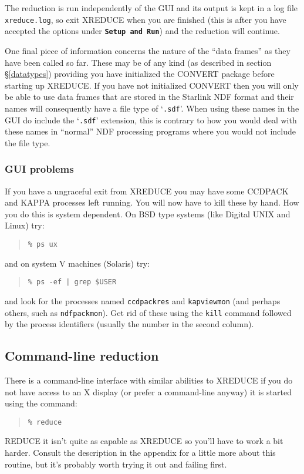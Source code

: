 \documentclass[twoside,11pt]{article}
\newcommand{\hyperref}[4]{#2\ref{#4}#3}
\newcommand{\htmlref}[2]{#1}
\newcommand{\xref}[3]{#1}
\renewcommand{\_}{\texttt{\symbol{95}}}
\newenvironment{myquote}{\begin{quote}\begin{small}}{\end{small}\end{quote}}
\newcommand{\butt}[1]{{\small \bf \tt #1}}
\newcommand{\text}[1]{{\small \tt #1}}
\newcommand{\routine}[1]{{\sc #1}}
\newcommand{\xroutine}[1]{\htmlref{{\sc #1}}{#1}}
\begin{document}
The reduction is run independently of the GUI and its output is kept
in a log file \text{xreduce.log}, so exit \routine{XREDUCE} when you
are finished (this is after you have accepted the options under
\butt{Setup and Run}) and the reduction will continue.

One final piece of information concerns the nature of the ``data
frames'' as they have been called so far. These may be of any kind (as
described \hyperref{later}{in section \S}{}{datatypes}) providing you
have initialized the \xref{CONVERT}{sun55}{} package before starting
up \routine{XREDUCE}.  If you have not initialized CONVERT then you
will only be able to use data frames that are stored in the Starlink
\xref{NDF}{sun33}{} format and their names will consequently have a
file type of `\text{.sdf}'. When using these names in the GUI do
include the `\text{.sdf}' extension, this is contrary to how you would
deal with these names in ``normal'' NDF processing programs where you
would not include the file type.

\subsubsection{GUI problems}
If you have a ungraceful exit from \xroutine{XREDUCE} you may have
some CCDPACK and \xref{KAPPA}{sun95}{} processes left running.  You
will now have to kill these by hand.  How you do this is system
dependent.  On BSD type systems (like Digital UNIX and Linux) try:
\begin{myquote}
\begin{verbatim}
% ps ux
\end{verbatim}
\end{myquote}
and on system V machines (Solaris) try:
\begin{myquote}
\begin{verbatim}
% ps -ef | grep $USER
\end{verbatim}
\end{myquote}
and look for the processes named \text{ccdpack\_res} and
\text{kapview\_mon} (and perhaps others, such as
\text{ndfpack\_mon}).
Get rid of these using the \text{kill} command followed by the
process identifiers (usually the number in the second column).

\subsection{Command-line reduction}
There is a command-line interface with similar abilities to
\xroutine{XREDUCE} if you do not have access to an X display (or prefer
a command-line anyway) it is started using the command:
\begin{myquote}
\begin{verbatim}
% reduce
\end{verbatim}
\end{myquote}
\xroutine{REDUCE} it isn't quite as capable as \routine{XREDUCE} so
you'll have to work a bit harder.  Consult the description in the
appendix for a little more about this routine, but it's probably
worth trying it out and failing first.
\end{document}
